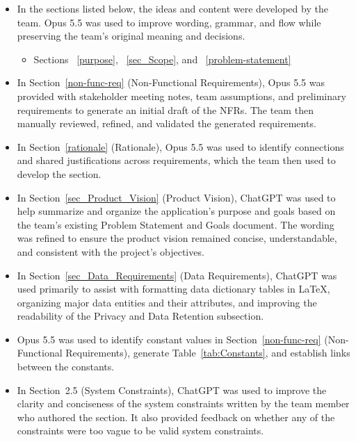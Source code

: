 \documentclass[12pt]{article}
\begin{document}
\begin{itemize}
    \item In the sections listed below, the ideas and content
    were developed by the team. Opus 5.5 was used to improve wording,
    grammar, and flow while preserving the team's original meaning and decisions.

    \begin{itemize}
        \item Sections ~\ref{purpose}, ~\ref{sec_Scope}, and ~\ref{problem-statement}
    \end{itemize}

    \item In Section~\ref{non-func-req} (Non-Functional Requirements), Opus 5.5 was
    provided with stakeholder meeting notes, team assumptions, and preliminary requirements
    to generate an initial draft of the NFRs. The team then manually reviewed, refined,
    and validated the generated requirements.

    \item In Section~\ref{rationale} (Rationale), Opus 5.5 was used to identify connections
    and shared justifications across requirements, which the team then used to develop the section.

    \item In Section~\ref{sec_Product_Vision} (Product Vision),
    ChatGPT was used to help summarize and organize the
    application's purpose and goals based on the team's
    existing Problem Statement and Goals document.
    The wording was refined to ensure the product vision
    remained concise, understandable, and consistent
    with the project's objectives.

    \item In Section~\ref{sec_Data_Requirements} (Data Requirements),
    ChatGPT was used primarily to assist with formatting
    data dictionary tables in \LaTeX{}, organizing major
    data entities and their attributes, and improving
    the readability of the Privacy and Data Retention
    subsection.

    \item Opus 5.5 was used to identify constant values in Section~\ref{non-func-req} (Non-Functional Requirements),
    generate Table~\ref{tab:Constants}, and establish links between the constants.

    \item In Section~2.5 (System Constraints), ChatGPT was used to improve
    the clarity and conciseness of the system constraints written by the
    team member who authored the section. It also provided feedback on
    whether any of the constraints were too vague to be valid system constraints.


\end{itemize}
\end{document}

